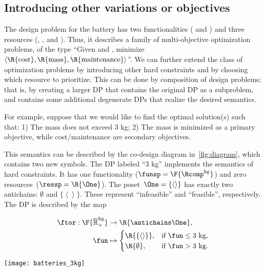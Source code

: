 \subsection{Introducing other variations or objectives}

The design problem for the battery has two functionalities (
and ) and three resources (, ,
and ). Thus, it describes a family of multi-objective
optimization problems, of the type ``Given  and ,
minimize $\left\langle \R{\text{cost}},\R{\text{mass}},\R{\text{maintenance}}\right\rangle $''.
We can further extend the class of optimization problems by introducing
other hard constraints and by choosing which resource to prioritize.
This can be done by composition of design problems; that is, by creating
a larger DP that contains the original DP as a subproblem, and contains
some additional degenerate DPs that realize the desired semantics.

For example, suppose that we would like to find the optimal solution(s)
such that: 1) The mass does not exceed 3 kg; 2) The mass is minimized
as a primary objective, while cost/maintenance are secondary objectives.

This semantics can be described by the co-design diagram in~\cref{fig:diagram},
which contains two new symbols. The DP labeled ``3 kg'' implements
the semantics of hard constraints. It has one functionality ($\funsp=\F{\Rcomp^{\text{kg}}}$)
and zero resources~($\ressp=\R{\One}$). The poset~$\One=\{\left\langle \right\rangle \}$
has exactly two antichains: $\emptyset$ and $\{\left\langle \right\rangle \}$.
These represent ``infeasible'' and ``feasible'', respectively.
The DP is described by the map

\quad\quad
\begin{minipage}[c]{5cm}
  \begin{align*}
    \ftor:\F{\mathbb{\overline{R}}_{+}^{\text{kg}}} & \rightarrow\R{\antichains\One},\\
    \fun& \mapsto\begin{cases}
                   \R{\{\left\langle \right\rangle \}}, & \text{if }\fun\leq\text{3 kg},\\
                   \R{\emptyset}, & \text{if }\fun>\text{3 kg}.
    \end{cases}
  \end{align*}

\end{minipage}\quad\texttt{[image: batteries\_3kg]}

